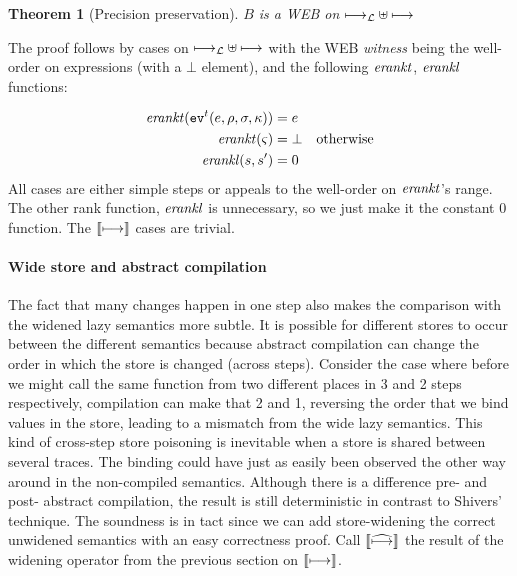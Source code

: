 \documentclass[9pt]{sigplanconf} %
\newtheorem{theorem}{Theorem}
\begin{document}
\begin{theorem}[Precision preservation]
$B$ is a WEB on $\lmachstep \uplus \machstep$
\end{theorem}

The proof follows by cases on $\lmachstep \uplus \machstep$ with the
WEB \emph{witness} being the well-order on expressions (with a $\bot$
element), and the following $\erankt$, $\erankl$ functions:

\begin{align*}
\erankt(\ev[^\mcntr]{\mexp,\menv,\msto,\mkont}) &= \mexp \\
\erankt(\mstate) &= \bot \quad \text{otherwise} \\
\erankl(s,s') &= 0
\end{align*}
All cases are either simple steps or appeals to the well-order on $\erankt$'s range. The other rank function,
$\erankl$ is unnecessary, so we just make it the constant 0
function. The $\cmachstep$ cases are trivial.

\paragraph{Wide store and abstract compilation}
The fact that many changes happen in one step also makes the
comparison with the widened lazy semantics more subtle. It is possible
for different stores to occur between the different semantics because
abstract compilation can change the order in which the store is
changed (across steps). Consider the case where before we might call
the same function from two different places in 3 and 2 steps
respectively, compilation can make that 2 and 1, reversing the order
that we bind values in the store, leading to a mismatch from the wide
lazy semantics.  This kind of cross-step store poisoning is inevitable
when a store is shared between several traces. The binding could have
just as easily been observed the other way around in the non-compiled
semantics. Although there is a difference pre- and post- abstract
compilation, the result is still deterministic in contrast to Shivers'
technique. The soundness is in tact since we can add store-widening
the correct unwidened semantics with an easy correctness proof. Call
$\camachstep$ the result of the widening operator from the previous
section on $\cmachstep$.


\end{document}
